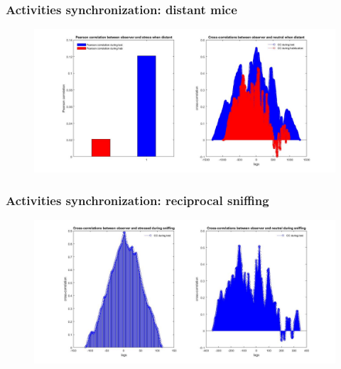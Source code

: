 \documentclass{beamer}
\begin{document}
\begin{frame}
\frametitle{Activities synchronization: distant mice}





\begin{figure}[H]
	\begin{center}
		\hspace*{-1cm}
		\includegraphics[scale=.30]{distant_sync.jpg} 
	\end{center}  
	
	
\end{figure}


\end{frame}	


\begin{frame}
\frametitle{Activities synchronization: reciprocal sniffing}





\begin{figure}[H]
	\begin{center}
		\hspace*{-1cm}
		\includegraphics[scale=.30]{sniff_corr.jpg} 
	\end{center}  
	
	
\end{figure}


\end{frame}	
\end{document}

